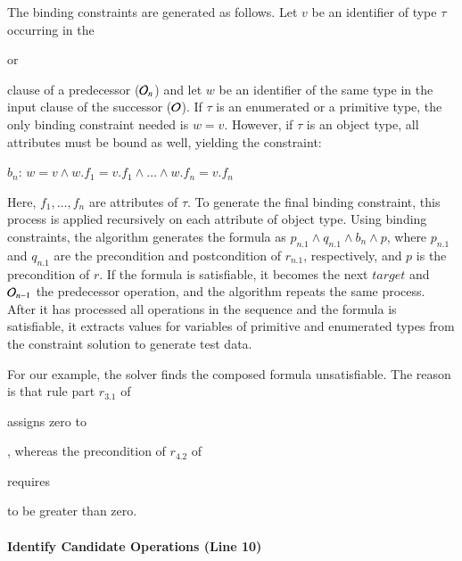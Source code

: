 The binding constraints are generated as follows. Let $v$ be an identifier of
type $\tau$ occurring in the \subject{creates} or \subject{modifies} clause of a
predecessor (\eg ${\cal O}_n$) and let $w$ be an identifier of the same type in
the input clause of the successor (\eg ${\cal O}$). If $\tau$ is an enumerated
or a primitive type, the only binding constraint needed is $w = v$. However, if
$\tau$ is an object type, all attributes must be bound as well, yielding the
constraint:

\vskip 2pt
$b_n$: $w = v \wedge w.f_1 = v.f_1 \wedge \ldots \wedge w.f_n = v.f_n$ 
\vskip 2pt

Here, $f_1, \ldots , f_n$ are attributes of $\tau$. To generate the final
binding constraint, this process is applied recursively on each attribute of
object type. Using binding constraints, the algorithm generates the formula as
$p_{n.1} \wedge q_{n.1} \wedge b_n \wedge p$, where $p_{n.1}$ and $q_{n.1}$ are
the precondition and postcondition of $r_{n.1}$, respectively, and $p$ is the
precondition of $r$. If the formula
is satisfiable, it becomes the next $target$ and ${\cal O}_{n-1}$ the
predecessor operation, and the algorithm repeats the same process.  After it has
processed all operations in the sequence and the formula is satisfiable, it
extracts values for variables of primitive and enumerated types from the
constraint solution to generate test data.

For our example, the solver finds the composed formula unsatisfiable. The reason
is that rule part $r_{3.1}$ of \subject{CreateOrder} assigns zero to
\subject{Order.total}, whereas the precondition of $r_{4.2}$ of
\subject{GenerateInvoice} requires \subject{total} to be greater than zero.



\paragraph*{Identify Candidate Operations (Line 10)}

